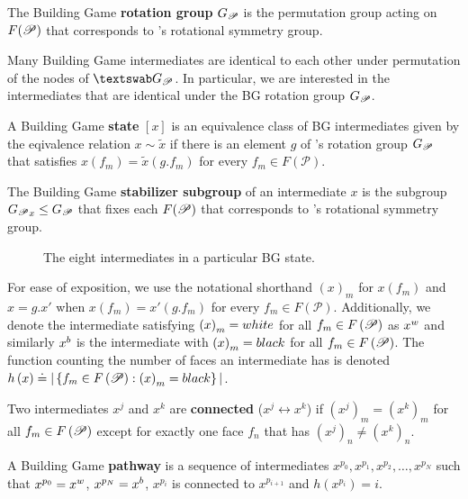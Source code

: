 \begin{mydef}
The Building Game \textbf{rotation group} ${G_\mathscr{P}}$ is the permutation group acting on $F(\mathscr{P})$ that corresponds to \poly's rotational symmetry group.
\end{mydef}
Many Building Game intermediates are identical to each other under permutation of the nodes of $\PolyGraph$. In particular, we are interested in the intermediates that are identical under the BG rotation group ${G_\mathscr{P}}$.    
\begin{mydef}
A Building Game \textbf{state} $[x]$ is an equivalence class of BG intermediates given by the eqivalence relation  $x \sim \tilde{x}$ if there is an element $g$ of \poly's rotation group ${G_\mathscr{P}}$ that satisfies $x(f_m) = \tilde{x}(g.f_m)$ for every $f_m \in F(\mathscr{P})$. 
\end{mydef}
\begin{mydef}
The Building Game \textbf{stabilizer subgroup} of an intermediate $x$ is the subgroup ${G_\mathscr{P}}_x \leq {G_\mathscr{P}}$ that fixes each  $F(\mathscr{P})$ that corresponds to \poly's rotational symmetry group.
\end{mydef}

\begin{figure}[ht]
\caption{The eight intermediates in a particular BG state.}
\label{fig:CubeState}
\end{figure}

For ease of exposition, we use the notational shorthand $\left(x\right)_m$ for $x\left(f_m\right)$ and $x = g.x'$ when $x(f_m) = x'(g.f_m)$ for every $f_m \in F(\mathscr{P})$. Additionally, we denote the intermediate satisfying $\left(x\right)_m = white$ for all $f_m \in F\left(\mathscr{P}\right)$ as $x^w$ and similarly $x^b$ is the intermediate with $\left(x\right)_m = black$ for all $f_m \in F\left(\mathscr{P}\right)$. The function counting the number of \spc faces an intermediate has is denoted $h\left(x\right) \doteq |\left\{f_m \in F\left(\mathscr{P}\right) : \left(x\right)_m = black\right\}|$.

\begin{mydef}
Two intermediates $x^j$ and $x^k$ are \textbf{connected} ($x^j \leftrightarrow x^k$) if $\left(x^j\right)_m = \left(x^k\right)_m$ for all $f_m \in F\left(\mathscr{P}\right)$ except for exactly one face $f_n$ that has  $\left(x^j\right)_n \neq \left(x^k\right)_n$.
\end{mydef}
\begin{mydef}
A Building Game \textbf{pathway} is a sequence of intermediates $x^{p_0}, x^{p_1}, x^{p_2}, \dots, x^{p_N}$ such that $x^{p_0} = x^w$, $x^{p_N} = x^b$, $x^{p_i}$ is connected to $x^{p_{i+1}}$ and $h\left(x^{p_i}\right) = i$.
\end{mydef}

